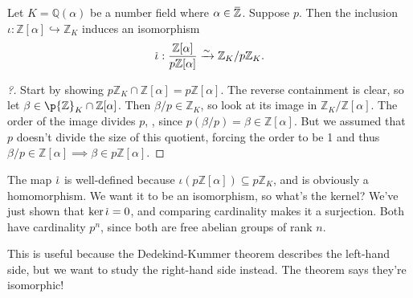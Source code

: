 \begin{lemma}[?]

Let \(K = {\mathbb{Q}}( \alpha)\) be a number field where
\(\alpha \in \mkern 1.5mu\overline{\mkern-1.5mu{\mathbb{Z}}\mkern-1.5mu}\mkern 1.5mu\).
Suppose
\(p%
\). Then the inclusion
\(\iota: {\mathbb{Z}}[\alpha] \hookrightarrow{\mathbb{Z}}_K\) induces an
isomorphism
\begin{align*}
\mkern 1.5mu\overline{\mkern-1.5mu\iota\mkern-1.5mu}\mkern 1.5mu: {{\mathbb{Z}}[\alpha] \over p {\mathbb{Z}}[ \alpha] } \xrightarrow{\sim} {\mathbb{Z}}_K/p{\mathbb{Z}}_K
.\end{align*}

\end{lemma}

\begin{proof}[?]

Start by showing
\(p {\mathbb{Z}}_K \cap{\mathbb{Z}}[ \alpha] = p {\mathbb{Z}}[ \alpha ]\).
The reverse containment is clear, so let
\(\beta\in \p {\mathbb{Z}}_K \cap{\mathbb{Z}}[ \alpha ]\). Then
\(\beta/p \in {\mathbb{Z}}_K\), so look at its image in
\({\mathbb{Z}}_K/ {\mathbb{Z}}[ \alpha]\). The order of the image
divides \(p\), , since
\(p (\beta/p) = \beta \in {\mathbb{Z}}[ \alpha]\). But we assumed that
\(p\) doesn't divide the size of this quotient, forcing the order to be
1 and thus
\(\beta/p\in {\mathbb{Z}}[ \alpha] \implies \beta \in p{\mathbb{Z}}[ \alpha]\).

\end{proof}

\begin{remark}

The map
\(\mkern 1.5mu\overline{\mkern-1.5mu\iota\mkern-1.5mu}\mkern 1.5mu\) is
well-defined because
\(\iota( p {\mathbb{Z}}[ \alpha]) \subseteq p{\mathbb{Z}}_K\), and is
obviously a homomorphism. We want it to be an isomorphism, so what's the
kernel? We've just shown that
\(\ker \mkern 1.5mu\overline{\mkern-1.5mu\iota \mkern-1.5mu}\mkern 1.5mu= 0\),
and comparing cardinality makes it a surjection. Both have cardinality
\(p^n\), since both are free abelian groups of rank \(n\).

\end{remark}

\begin{remark}

This is useful because the Dedekind-Kummer theorem describes the
left-hand side, but we want to study the right-hand side instead. The
theorem says they're isomorphic!

\end{remark}

